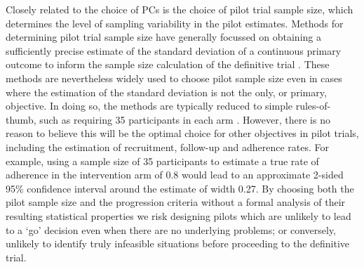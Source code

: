 \documentclass[AMA,STIX1COL]{WileyNJD-v2}
\begin{document}

Closely related to the choice of PCs is the choice of pilot trial sample size, which determines the level of sampling variability in the pilot estimates. Methods for determining pilot trial sample size have generally focussed on obtaining a sufficiently precise estimate of the standard deviation of a continuous primary outcome to inform the sample size calculation of the definitive trial \cite{Browne1995, Julious2005, Sim2012, Teare2014, Eldridge2015, Whitehead2015}. These methods are nevertheless widely used to choose pilot sample size even in cases where the estimation of the standard deviation is not the only, or primary, objective. In doing so, the methods are typically reduced to simple rules-of-thumb, such as requiring 35 participants in each arm \cite{Teare2014}. However, there is no reason to believe this will be the optimal choice for other objectives in pilot trials, including the estimation of recruitment, follow-up and adherence rates. For example, using a sample size of 35 participants to estimate a true rate of adherence in the intervention arm of 0.8 would lead to an approximate 2-sided 95\% confidence interval around the estimate of width 0.27. By choosing both the pilot sample size and the progression criteria without a formal analysis of their resulting statistical properties we risk designing pilots which are unlikely to lead to a `go' decision even when there are no underlying problems; or conversely, unlikely to identify truly infeasible situations before proceeding to the definitive trial.

\end{document}
